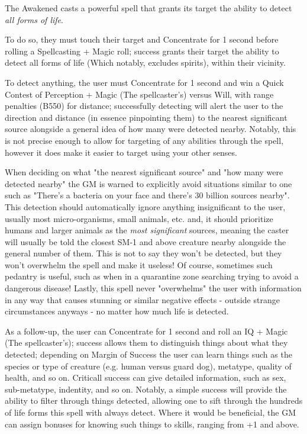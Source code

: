 \begin{multicols}{3}
	The Awakened casts a powerful spell that grants its target the ability to detect \textit{all forms of life}.
	
	To do so, they must touch their target and Concentrate for 1 second before rolling a Spellcasting + Magic roll; success grants their target the ability to detect all forms of life (Which notably, excludes spirits), within their vicinity.
	
	To detect anything, the user must Concentrate for 1 second and win a Quick Contest of Perception + Magic (The spellcaster's) versus Will, with range penalties (B550) for distance; successfully detecting will alert the user to the direction and distance (in essence pinpointing them) to the nearest significant source alongside a general idea of how many were detected nearby. Notably, this is not precise enough to allow for targeting of any abilities through the spell, however it does make it easier to target using your other senses.
	
	When deciding on what "the nearest significant source" and "how many were detected nearby" the GM is warned to explicitly avoid situations similar to one such as "There's a bacteria on your face and there's 30 billion sources nearby". This detection should automatically ignore anything insignificant to the user, usually most micro-organisms, small animals, etc. and, it should prioritize humans and larger animals as the \textit{most significant} sources, meaning the caster will usually be told the closest SM-1 and above creature nearby alongside the general number of them. This is not to say they won't be detected, but they won't overwhelm the spell and make it useless! Of course, sometimes such pedantry is useful, such as when in a quarantine zone searching trying to avoid a dangerous disease! Lastly, this spell never "overwhelms" the user with information in any way that causes stunning or similar negative effects - outside strange circumstances anyways - no matter how much life is detected.
	
	As a follow-up, the user can Concentrate for 1 second and roll an IQ + Magic (The spellcaster's); success allows them to distinguish things about what they detected; depending on Margin of Success the user can learn things such as the species or type of creature (e.g. human versus guard dog), metatype, quality of health, and so on. Criticall success can give detailed information, such as sex, sub-metatype, indentity, and so on. Notably, a simple success will provide the ability to filter through things detected, allowing one to sift through the hundreds of life forms this spell with always detect. Where it would be beneficial, the GM can assign bonuses for knowing such things to skills, ranging from +1 and above.
	

\end{multicols}
